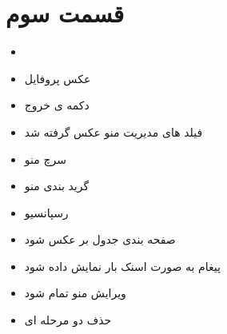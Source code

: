 \documentclass[12pt]{article}
\begin{document}
\section{قسمت سوم}


\begin{itemize}
	\item {}
	\item عکس پروفایل
	\item دکمه ی خروج
	\item فیلد های مدیریت منو عکس گرفته شد
	\qquad \checkmark 
	\item سرچ منو
	\item گرید بندی منو
	\item رسپانسیو
	\item صفحه بندی جدول بر عکس شود
	\qquad \checkmark 
	\item پیغام به صورت اسنک بار نمایش داده شود
	\qquad \checkmark 
	\item ویرایش منو تمام شود
	\item حذف دو مرحله ای
	\qquad \checkmark 
\end{itemize}
\end{document}
